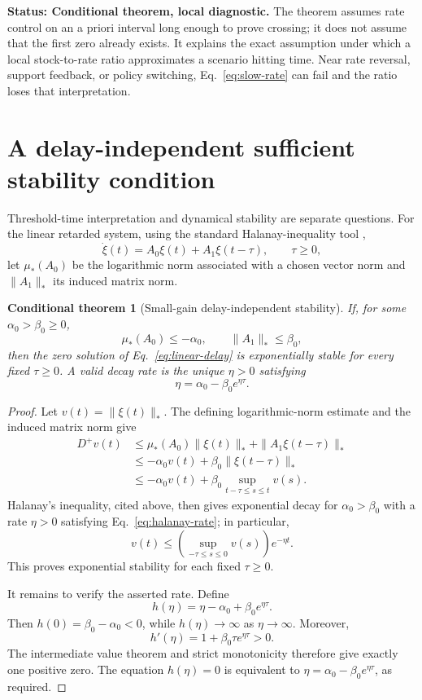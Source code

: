 \documentclass[11pt]{article}
\newtheorem{conditionaltheorem}{Conditional theorem}
\theoremstyle{definition}
\newcommand{\status}[1]{\par\smallskip\noindent\textbf{Status: #1.}\quad}
\begin{document}
\status{Conditional theorem, local diagnostic} The theorem assumes rate control on an a priori interval long enough to prove crossing; it does not assume that the first zero already exists. It explains the exact assumption under which a local stock-to-rate ratio approximates a scenario hitting time. Near rate reversal, support feedback, or policy switching, Eq.~\eqref{eq:slow-rate} can fail and the ratio loses that interpretation.

\section{A delay-independent sufficient stability condition}

Threshold-time interpretation and dynamical stability are separate questions. For the linear retarded system, using the standard Halanay-inequality tool \cite{halanay1966},
\begin{equation}
\dot\xi(t)=A_0\xi(t)+A_1\xi(t-\tau),
\qquad \tau\ge0,
\label{eq:linear-delay}
\end{equation}
let $\mu_*(A_0)$ be the logarithmic norm associated with a chosen vector norm and $\|A_1\|_*$ its induced matrix norm.

\begin{conditionaltheorem}[Small-gain delay-independent stability]
\label{thm:small-gain}
If, for some $\alpha_0>\beta_0\ge0$,
\[
\mu_*(A_0)\le-\alpha_0,
\qquad
\|A_1\|_*\le \beta_0,
\]
then the zero solution of Eq.~\eqref{eq:linear-delay} is exponentially stable for every fixed $\tau\ge0$. A valid decay rate is the unique $\eta>0$ satisfying
\begin{equation}
\eta=\alpha_0-\beta_0e^{\eta\tau}.
\label{eq:halanay-rate}
\end{equation}
\end{conditionaltheorem}

\begin{proof}
Let $v(t)=\|\xi(t)\|_*$. The defining logarithmic-norm estimate and the induced matrix norm give
\begin{align*}
D^+v(t)
&\le\mu_*(A_0)\|\xi(t)\|_*+\|A_1\xi(t-\tau)\|_*\\
&\le-\alpha_0 v(t)+\beta_0\|\xi(t-\tau)\|_*\\
&\le-\alpha_0 v(t)+\beta_0\sup_{t-\tau\le s\le t}v(s).
\end{align*}
Halanay's inequality, cited above, then gives exponential decay for $\alpha_0>\beta_0$ with a rate $\eta>0$ satisfying Eq.~\eqref{eq:halanay-rate}; in particular,
\[
v(t)\le\left(\sup_{-\tau\le s\le0}v(s)\right)e^{-\eta t}.
\]
This proves exponential stability for each fixed $\tau\ge0$.

It remains to verify the asserted rate. Define
\[
h(\eta)=\eta-\alpha_0+\beta_0e^{\eta\tau}.
\]
Then $h(0)=\beta_0-\alpha_0<0$, while $h(\eta)\to\infty$ as $\eta\to\infty$. Moreover,
\[
h'(\eta)=1+\beta_0\tau e^{\eta\tau}>0.
\]
The intermediate value theorem and strict monotonicity therefore give exactly one positive zero. The equation $h(\eta)=0$ is equivalent to $\eta=\alpha_0-\beta_0e^{\eta\tau}$, as required.
\end{proof}
\end{document}
